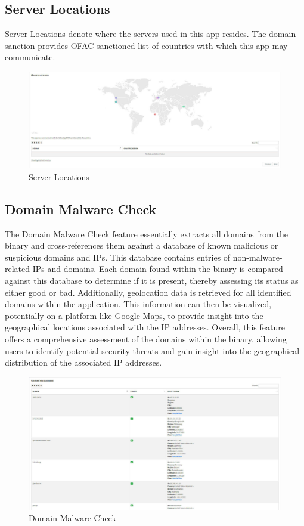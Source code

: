 \documentclass{report}
\begin{document}
\subsection*{Server Locations}
Server Locations denote where the servers used in this app resides. The domain sanction provides OFAC sanctioned list of countries with which this app may communicate.
\begin{figure}[hbt!]
    \centering
    \includegraphics[width=1\textwidth]{images/serverlocations.jpg}
    \caption{Server Locations}
    \label{fig:example}
\end{figure}
\FloatBarrier

\subsection{Domain Malware Check}
The Domain Malware Check feature essentially extracts all domains from the binary and cross-references them against a database of known malicious or suspicious domains and IPs. This database contains entries of non-malware-related IPs and domains. Each domain found within the binary is compared against this database to determine if it is present, thereby assessing its status as either good or bad. \newline
Additionally, geolocation data is retrieved for all identified domains within the application. This information can then be visualized, potentially on a platform like Google Maps, to provide insight into the geographical locations associated with the IP addresses. \newline
Overall, this feature offers a comprehensive assessment of the domains within the binary, allowing users to identify potential security threats and gain insight into the geographical distribution of the associated IP addresses.
\begin{figure}[hbt!]
    \centering
    \includegraphics[width=1\textwidth]{images/domain_malware_check.jpg}
    \caption{Domain Malware Check}
    \label{fig:example}
\end{figure}
\FloatBarrier
\end{document}
